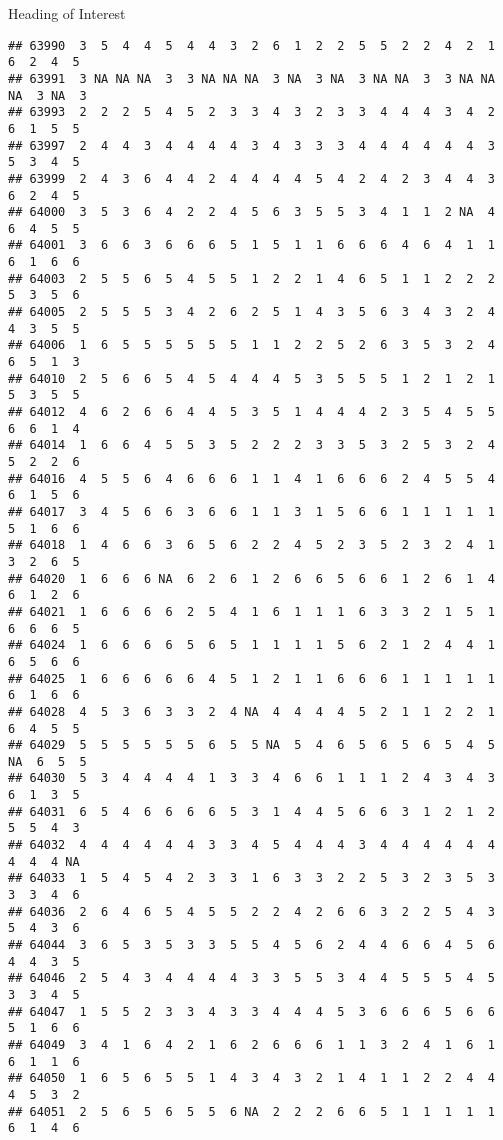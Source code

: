 \documentclass[
  ignorenonframetext,
]{beamer}
\begin{document}
\begin{frame}[fragile]{Heading of Interest}
\begin{verbatim}
## 63990  3  5  4  4  5  4  4  3  2  6  1  2  2  5  5  2  2  4  2  1  6  2  4  5
## 63991  3 NA NA NA  3  3 NA NA NA  3 NA  3 NA  3 NA NA  3  3 NA NA NA  3 NA  3
## 63993  2  2  2  5  4  5  2  3  3  4  3  2  3  3  4  4  4  3  4  2  6  1  5  5
## 63997  2  4  4  3  4  4  4  4  3  4  3  3  3  4  4  4  4  4  4  3  5  3  4  5
## 63999  2  4  3  6  4  4  2  4  4  4  4  5  4  2  4  2  3  4  4  3  6  2  4  5
## 64000  3  5  3  6  4  2  2  4  5  6  3  5  5  3  4  1  1  2 NA  4  6  4  5  5
## 64001  3  6  6  3  6  6  6  5  1  5  1  1  6  6  6  4  6  4  1  1  6  1  6  6
## 64003  2  5  5  6  5  4  5  5  1  2  2  1  4  6  5  1  1  2  2  2  5  3  5  6
## 64005  2  5  5  5  3  4  2  6  2  5  1  4  3  5  6  3  4  3  2  4  4  3  5  5
## 64006  1  6  5  5  5  5  5  5  1  1  2  2  5  2  6  3  5  3  2  4  6  5  1  3
## 64010  2  5  6  6  5  4  5  4  4  4  5  3  5  5  5  1  2  1  2  1  5  3  5  5
## 64012  4  6  2  6  6  4  4  5  3  5  1  4  4  4  2  3  5  4  5  5  6  6  1  4
## 64014  1  6  6  4  5  5  3  5  2  2  2  3  3  5  3  2  5  3  2  4  5  2  2  6
## 64016  4  5  5  6  4  6  6  6  1  1  4  1  6  6  6  2  4  5  5  4  6  1  5  6
## 64017  3  4  5  6  6  3  6  6  1  1  3  1  5  6  6  1  1  1  1  1  5  1  6  6
## 64018  1  4  6  6  3  6  5  6  2  2  4  5  2  3  5  2  3  2  4  1  3  2  6  5
## 64020  1  6  6  6 NA  6  2  6  1  2  6  6  5  6  6  1  2  6  1  4  6  1  2  6
## 64021  1  6  6  6  6  2  5  4  1  6  1  1  1  6  3  3  2  1  5  1  6  6  6  5
## 64024  1  6  6  6  6  5  6  5  1  1  1  1  5  6  2  1  2  4  4  1  6  5  6  6
## 64025  1  6  6  6  6  6  4  5  1  2  1  1  6  6  6  1  1  1  1  1  6  1  6  6
## 64028  4  5  3  6  3  3  2  4 NA  4  4  4  4  5  2  1  1  2  2  1  6  4  5  5
## 64029  5  5  5  5  5  5  6  5  5 NA  5  4  6  5  6  5  6  5  4  5 NA  6  5  5
## 64030  5  3  4  4  4  4  1  3  3  4  6  6  1  1  1  2  4  3  4  3  6  1  3  5
## 64031  6  5  4  6  6  6  6  5  3  1  4  4  5  6  6  3  1  2  1  2  5  5  4  3
## 64032  4  4  4  4  4  4  3  3  4  5  4  4  4  3  4  4  4  4  4  4  4  4  4 NA
## 64033  1  5  4  5  4  2  3  3  1  6  3  3  2  2  5  3  2  3  5  3  3  3  4  6
## 64036  2  6  4  6  5  4  5  5  2  2  4  2  6  6  3  2  2  5  4  3  5  4  3  6
## 64044  3  6  5  3  5  3  3  5  5  4  5  6  2  4  4  6  6  4  5  6  4  4  3  5
## 64046  2  5  4  3  4  4  4  4  3  3  5  5  3  4  4  5  5  5  4  5  3  3  4  5
## 64047  1  5  5  2  3  3  4  3  3  4  4  4  5  3  6  6  6  5  6  6  5  1  6  6
## 64049  3  4  1  6  4  2  1  6  2  6  6  6  1  1  3  2  4  1  6  1  6  1  1  6
## 64050  1  6  5  6  5  5  1  4  3  4  3  2  1  4  1  1  2  2  4  4  4  5  3  2
## 64051  2  5  6  5  6  5  5  6 NA  2  2  2  6  6  5  1  1  1  1  1  6  1  4  6

\end{verbatim}
\end{frame}
\end{document}
